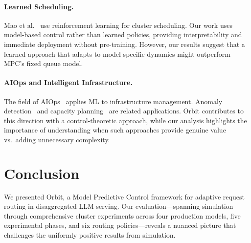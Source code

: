 \documentclass[runningheads]{llncs}
\begin{document}
\paragraph{Learned Scheduling.} Mao et al.~\cite{mao2019learning} use reinforcement learning for cluster scheduling. Our work uses model-based control rather than learned policies, providing interpretability and immediate deployment without pre-training. However, our results suggest that a learned approach that adapts to model-specific dynamics might outperform MPC's fixed queue model.

\paragraph{AIOps and Intelligent Infrastructure.} The field of AIOps~\cite{dang2019aiops} applies ML to infrastructure management. Anomaly detection~\cite{zhao2021anomaly} and capacity planning~\cite{cortez2017capacity} are related applications. Orbit contributes to this direction with a control-theoretic approach, while our analysis highlights the importance of understanding when such approaches provide genuine value vs.\ adding unnecessary complexity.

\section{Conclusion}

We presented Orbit, a Model Predictive Control framework for adaptive request routing in disaggregated LLM serving. Our evaluation---spanning simulation through comprehensive cluster experiments across four production models, five experimental phases, and six routing policies---reveals a nuanced picture that challenges the uniformly positive results from simulation.
\end{document}
